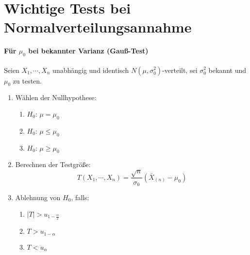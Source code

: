 \documentclass[a4paper, 11pt, accentcolor = tud3b]{tudreport}
\newcommand{\abs}[1]{\ensuremath{{\lvert #1 \rvert}}}
\begin{document}
        \section{Wichtige Tests bei Normalverteilungsannahme}
            \paragraph{Für \(\mu_0\) bei bekannter Varianz (Gauß-Test)}
	            Seien \( X_1, \cdots, X_n \) unabhängig und identisch \( N(\mu, \sigma_0^2) \)-verteilt, sei \(\sigma_0^2\) bekannt und \(\mu_0\) zu testen.
                \begin{enumerate}
                	\item Wählen der Nullhypothese:
	                	\begin{enumerate}[label = \Alph*)]
	                		\item \( H_0 \): \quad \( \mu = \mu_0 \)
	                		\item \( H_0 \): \quad \( \mu \leq \mu_0 \)
	                		\item \( H_0 \): \quad \( \mu \geq \mu_0 \)
	                	\end{enumerate}
                	\item Berechnen der Testgröße:
	                	\begin{equation*}
		                	T(X_1, \cdots, X_n) = \frac{\sqrt{n}}{\sigma_0} (\bar{X}_{(n)} - \mu_0)
	                	\end{equation*}
		            \item Ablehnung von \(H_0\), falls:
			            \begin{enumerate}[label = \Alph*)]
			            	\item \( \abs{T} > u_{1 - \frac{\alpha}{2}} \)
			            	\item \( T > u_{1 - \alpha} \)
			            	\item \( T < u_\alpha \)
			            \end{enumerate}
                \end{enumerate}
\end{document}
